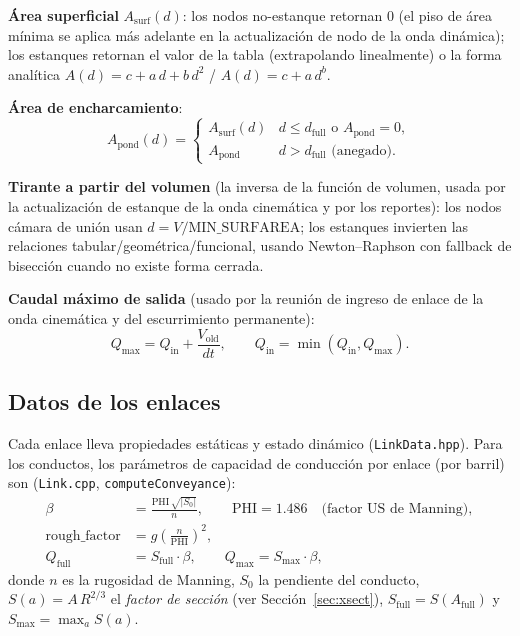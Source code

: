 \documentclass[11pt,a4paper]{article}
\begin{document}
\textbf{Área superficial} $A_{\mathrm{surf}}(d)$: los nodos no-estanque
retornan 0 (el piso de área mínima se aplica más adelante en la actualización
de nodo de la onda dinámica); los estanques retornan el valor de la tabla
(extrapolando linealmente) o la forma analítica $A(d) = c + a\,d + b\,d^{2}$ /
$A(d) = c + a\,d^{b}$.

\textbf{Área de encharcamiento}:
\begin{equation}
  A_{\mathrm{pond}}(d) =
  \begin{cases}
    A_{\mathrm{surf}}(d) & d \le d_{\mathrm{full}} \text{ o } A_{\mathrm{pond}} = 0,\\
    A_{\mathrm{pond}} & d > d_{\mathrm{full}} \text{ (anegado)}.
  \end{cases}
\end{equation}

\textbf{Tirante a partir del volumen} (la inversa de la función de volumen,
usada por la actualización de estanque de la onda cinemática y por los
reportes): los nodos cámara de unión usan $d = V/\mathrm{MIN\_SURFAREA}$; los
estanques invierten las relaciones tabular/geométrica/funcional, usando
Newton--Raphson con fallback de bisección cuando no existe forma cerrada.

\textbf{Caudal máximo de salida} (usado por la reunión de ingreso de enlace de
la onda cinemática y del escurrimiento permanente):
\begin{equation}
  Q_{\max} = Q_{\mathrm{in}} + \frac{V_{\mathrm{old}}}{dt},
  \qquad Q_{\mathrm{in}} = \min\!\left(Q_{\mathrm{in}}, Q_{\max}\right).
\end{equation}

\subsection{Datos de los enlaces}

Cada enlace lleva propiedades estáticas y estado dinámico
(\texttt{LinkData.hpp}). Para los conductos, los parámetros de capacidad de
conducción por enlace (por barril) son (\texttt{Link.cpp},
\texttt{computeConveyance}):
\begin{align}
  \beta &= \frac{\mathrm{PHI}\,\sqrt{|S_0|}}{n}, \qquad \mathrm{PHI} = 1.486
    \quad\text{(factor US de Manning)}, \\
  \mathrm{rough\_factor} &= g\left(\frac{n}{\mathrm{PHI}}\right)^{2},\\
  Q_{\mathrm{full}} &= S_{\mathrm{full}}\cdot\beta,
  \qquad Q_{\max} = S_{\max}\cdot\beta,
\end{align}
donde $n$ es la rugosidad de Manning, $S_0$ la pendiente del conducto,
$S(a) = A\,R^{2/3}$ el \emph{factor de sección} (ver Sección~\ref{sec:xsect}),
$S_{\mathrm{full}} = S(A_{\mathrm{full}})$ y $S_{\max} = \max_a S(a)$.
\end{document}
